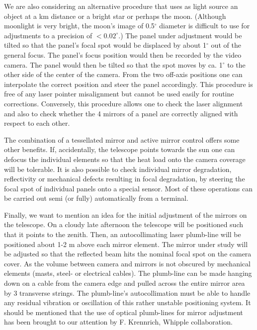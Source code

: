We are also considering an alternative procedure that uses as light source
an object at a km distance or a bright star or perhaps the moon. (Although
moonlight is very bright, the moon's image of 0.5$^\circ$ diameter is
difficult to use for adjustments to a precision of $< 0.02^\circ$.) The
panel under adjustment would be tilted so that the panel's focal spot would
be displaced by about 1$^\circ$ out of the general focus. The panel's focus
position would then be recorded by the video camera. The panel would then be
tilted so that the spot moves by ca. 1$^\circ$ to the other side of the
center of the camera. From the two off-axis positions one can interpolate
the correct position and steer the panel accordingly. This procedure is free
of any laser pointer misalignment but cannot be used easily for routine
corrections. Conversely, this procedure allows one to check the laser
alignment and also to check whether the 4 mirrors of a panel are correctly
aligned with respect to each other.

The combination of a tessellated mirror and active mirror control offers
some other benefits. If, accidentally, the telescope points towards the sun
one can defocus the individual elements so that the heat load onto the
camera coverage will be tolerable. It is also possible to check individual
mirror degradation, reflectivity or mechanical defects resulting in focal
degradation, by steering the focal spot of individual panels onto a special
sensor. Most of these operations can be carried out semi (or fully)
automatically from a terminal.

Finally, we want to mention an idea for the initial adjustment of the
mirrors on the telescope. On a cloudy 
late afternoon the telescope will be positioned
such that it points to the zenith. Then, an autocollimating laser plumb-line
will be positioned about 1-2 m above each mirror element. The mirror under
study will be adjusted so that the reflected beam hits the nominal focal
spot on the camera cover. As the volume between camera and mirrors is not
obscured by mechanical elements (masts, steel- or electrical cables). The
plumb-line can be made hanging down on a cable from the camera edge and
pulled across the entire mirror area by 3 transverse strings. The
plumb-line's autocollimation must be able to handle any residual vibration
or oscillation of this rather unstable positioning system. It should be
mentioned that the use of optical plumb-lines for mirror adjustment has been
brought to our attention by F. Krennrich, Whipple collaboration.

